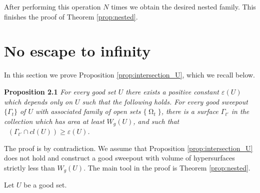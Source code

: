 \documentclass[12pt]{amsart}
\newtheorem{proposition*}{Proposition}
\DeclareMathOperator{\Hn}{\mathcal{H}^n}
\DeclareMathOperator{\Om}{\Omega}
\theoremstyle{definition}
\begin{document}
After performing this operation $N$ times we obtain 
the desired nested family. This finishes the 
proof of Theorem \ref*{prop:nested}.

\section{No escape to infinity} \label{sec: no escape}




In this section we prove Proposition \ref*{prop:intersection_U}, which we recall below.	

{\bf Proposition 2.1}
\textit{
For every good set $U$ there exists a positive constant $\varepsilon(U)$ which depends only on $U$ such that the following holds.
For every good sweepout $\{ \Gamma_t \}$ of $U$ with associated family of open sets $\{ \Om_t \}$, 
there is a surface $\Gamma_{t'}$ in the collection
which has area at least $W_g(U)$, and such that $\Hn( \Gamma_{t'} \cap cl(U) ) \geq \varepsilon(U)$.
}



The proof is by contradiction. 
We assume that Proposition \ref*{prop:intersection_U}
does not hold and construct a good sweepout
with volume of hypersurfaces strictly less
than $W_g(U)$. 
The main tool in the proof is Theorem 
\ref*{prop:nested}. 

%
%

Let $U$ be a good set. 
\end{document}
